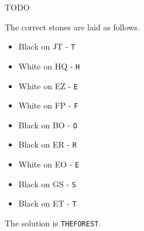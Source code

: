 

TODO


The correct stones are laid as follows.

\begin{multicols}{3}
\begin{itemize}
  \item Black on JT - \texttt{T}
  \item White on HQ - \texttt{H}
  \item White on EZ - \texttt{E}
  \item White on FP - \texttt{F}
  \item Black on BO - \texttt{O}
  \item Black on ER - \texttt{R}
  \item White on EO - \texttt{E}
  \item Black on GS - \texttt{S}
  \item Black on ET - \texttt{T}
\end{itemize}
\end{multicols}

The solution is \texttt{THEFOREST}.




